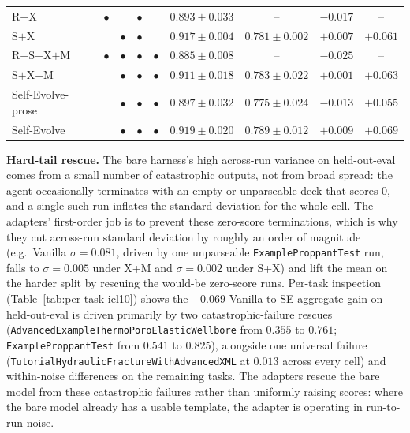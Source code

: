 \documentclass{article}
\begin{document}
\begin{table}[t]
{\begin{tabular}{l|cccc|cccc}
    R$+$X          & $\bullet$ &         & $\bullet$ &         & $0.893 \pm 0.033$           & --                           & $-0.017$          & --                \\
    S$+$X          &         & $\bullet$ & $\bullet$ &         & $0.917 \pm 0.004$           & $0.781 \pm \mathbf{0.002}$   & $+0.007$          & $+0.061$          \\
    R$+$S$+$X$+$M  & $\bullet$ & $\bullet$ & $\bullet$ & $\bullet$ & $0.885 \pm 0.008$           & --                           & $-0.025$          & --                \\
    \midrule
    S$+$X$+$M      &         & $\bullet$ & $\bullet$ & $\bullet$ & $0.911 \pm 0.018$           & $0.783 \pm 0.022$            & $+0.001$          & $+0.063$          \\
    Self-Evolve-prose &      & $\bullet$ & $\bullet$ & $\bullet$ & $0.897 \pm 0.032$           & $0.775 \pm 0.024$            & $-0.013$          & $+0.055$          \\
    Self-Evolve    &         & $\bullet$ & $\bullet$ & $\bullet$ & $0.919 \pm 0.020$           & $\mathbf{0.789 \pm 0.012}$   & $+0.009$          & $\mathbf{+0.069}$ \\
    \bottomrule
  \end{tabular}}
\end{table}

\textbf{Hard-tail rescue.} The bare harness's high across-run variance on held-out-eval comes from a small number of catastrophic outputs, not from broad spread: the agent occasionally terminates with an empty or unparseable deck that scores 0, and a single such run inflates the standard deviation for the whole cell. The adapters' first-order job is to prevent these zero-score terminations, which is why they cut across-run standard deviation by roughly an order of magnitude (e.g.\ Vanilla $\sigma = 0.081$, driven by one unparseable \texttt{ExampleProppantTest} run, falls to $\sigma = 0.005$ under X+M and $\sigma = 0.002$ under S+X) and lift the mean on the harder split by rescuing the would-be zero-score runs. Per-task inspection (Table~\ref{tab:per-task-icl10}) shows the $+0.069$ Vanilla-to-SE aggregate gain on held-out-eval is driven primarily by two catastrophic-failure rescues (\texttt{AdvancedExampleThermoPoroElasticWellbore} from $0.355$ to $0.761$; \texttt{ExampleProppantTest} from $0.541$ to $0.825$), alongside one universal failure (\texttt{TutorialHydraulicFractureWithAdvancedXML} at $0.013$ across every cell) and within-noise differences on the remaining tasks. The adapters rescue the bare model from these catastrophic failures rather than uniformly raising scores: where the bare model already has a usable template, the adapter is operating in run-to-run noise.
\end{document}
